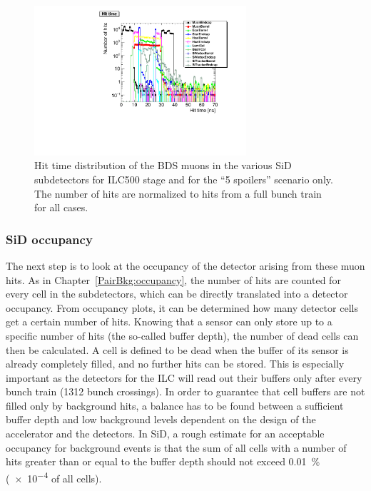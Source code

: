 \begin{figure}[htbp!]
\centering
\includegraphics[width=0.7\textwidth]{Figures/BDS_muons/hittime_ILC500_spoilers_superimposed.pdf}
\caption[Muon hit time in the SiD subdetectors]{Hit time distribution of the BDS muons in the various SiD subdetectors for ILC500 stage and for the ``5 spoilers'' scenario only.
The number of hits are normalized to hits from a full bunch train for all cases.}
\label{fig:BDS_Muons:hittime}
\end{figure}

\subsubsection{SiD occupancy}
The next step is to look at the occupancy of the detector arising from these muon hits.
As in Chapter~\ref{PairBkg:occupancy}, the number of hits are counted for every cell in the subdetectors, which can be directly translated into a detector occupancy.
From occupancy plots, it can be determined how many detector cells get a certain number of hits.
Knowing that a sensor can only store up to a specific number of hits (the so-called buffer depth), the number of dead cells can then be calculated.
A cell is defined to be dead when the buffer of its sensor is already completely filled, and no further hits can be stored.
This is especially important as the detectors for the ILC will read out their buffers only after every bunch train (1312 bunch crossings).
In order to guarantee that cell buffers are not filled only by background hits, a balance has to be found between a sufficient buffer depth and low background levels dependent on the design of the accelerator and the detectors.
In SiD, a rough estimate for an acceptable occupancy for background events is that the sum of all cells with a number of hits greater than or equal to the buffer depth should not exceed \SI{0.01}{\percent} (\num{e-4} of all cells). 

